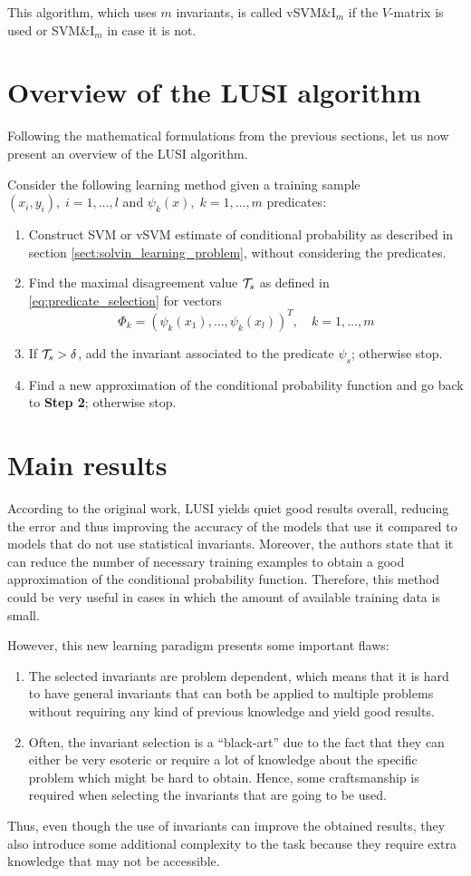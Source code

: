 This algorithm, which uses $m$ invariants, is called vSVM\&$\text{I}_m$ if the $V$-matrix is used
or SVM\&$\text{I}_m$ in case it is not.

\section{Overview of the LUSI algorithm}

Following the mathematical formulations from the previous sections, let us now present an overview of
the LUSI algorithm.

Consider the following learning method given a training sample $(x_i, y_i),\; i=1, \dots, l$ and
$\psi_k(x),\; k=1, \dots, m$ predicates:

\begin{enumerate}[label=\textbf{Step \arabic*:}]
    \item Construct SVM or vSVM estimate of conditional probability as described in section
    \ref{sect:solvin_learning_problem}, without considering the predicates.
    \item Find the maximal disagreement value $\mathcal{T}_s$ as defined in \eqref{eq:predicate_selection}
    for vectors
    \[
        \Phi_k = (\psi_k(x_1), \dots, \psi_k(x_l))^T,\quad k=1, \dots, m
    \]
    \item If $\mathcal{T}_s > \delta$, add the invariant associated to the predicate $\psi_s$; otherwise stop.
    \item Find a new approximation of the conditional probability function and go back to \textbf{Step 2};
    otherwise stop.
\end{enumerate}

\section{Main results}

According to the original work, LUSI yields quiet good results overall, reducing the error and thus improving
the accuracy of the models that use it compared to models that do not use statistical invariants. Moreover,
the authors state that it can reduce the number of necessary training examples to obtain a good approximation
of the conditional probability function. Therefore, this method could be very useful in cases in which the
amount of available training data is small.

However, this new learning paradigm presents some important flaws:

\begin{enumerate}
    \item The selected invariants are problem dependent, which means that it is hard to have general invariants
    that can both be applied to multiple problems without requiring any kind of previous knowledge
    and yield good results.
    \item Often, the invariant selection is a ``black-art'' due to the fact that they can either be
    very esoteric or require a lot of knowledge about the specific problem which might be hard
    to obtain. Hence, some craftsmanship is required when selecting the invariants that are going
    to be used.
\end{enumerate}

Thus, even though the use of invariants can improve the obtained results, they also introduce some additional
complexity to the task because they require extra knowledge that may not be accessible.

